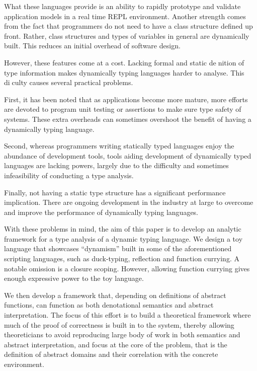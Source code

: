 \documentclass{CRPITStyle}
\begin{document}
What these languages provide is an ability to rapidly prototype and 
validate application models in a real time REPL environment. 
Another strength comes from the fact that programmers do not need 
to have a class structure defined up front.
Rather, class structures and types of variables in general are 
dynamically built. 
This reduces an initial overhead of software design.

However, these features come at a cost. 
Lacking formal and static de􏰄nition of type information makes 
dynamically typing languages harder to analyse. 
This di􏰅culty causes several practical problems.

First, it has been noted that as applications become more mature, 
more efforts are devoted to program unit testing or assertions 
to make sure type safety of systems. 
These extra overheads can sometimes overshoot the benefit of having
a dynamically typing language.

Second, whereas programmers writing statically typed languages enjoy 
the abundance of development tools, tools aiding development of 
dynamically typed languages are lacking powers, 
largely due to the difficulty and sometimes infeasibility of conducting
a type analysis.

Finally, not having a static type structure has a significant performance
implication. 
There are ongoing development in the industry at large to overcome and 
improve the performance of dynamically typing languages.

With these problems in mind, the aim of this paper is to develop an 
analytic framework for a type analysis of a dynamic typing language. 
We design a toy language that showcases ``dynamism'' built in some 
of the aforementioned scripting languages, such as duck-typing, 
reflection and function currying. 
A notable omission is a closure scoping. 
However, allowing function currying gives enough expressive power 
to the toy language.

We then develop a framework that, depending on definitions of 
abstract functions, can function as both denotational semantics 
and abstract interpretation. 
The focus of this effort is to build a theoretical framework where 
much of the proof of correctness is built in to the system, 
thereby allowing theoreticians to avoid reproducing large body of 
work in both semantics and abstract interpretation, and focus at 
the core of the problem, that is the definition of abstract domains
and their correlation with the concrete environment.
\end{document}

